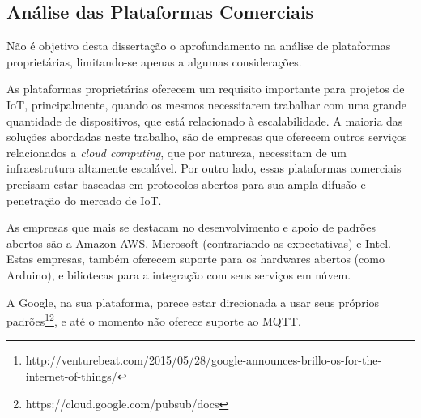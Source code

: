 \subsection{Análise das Plataformas Comerciais}

Não é objetivo desta dissertação o aprofundamento na análise de plataformas
proprietárias, limitando-se apenas a algumas considerações.

As plataformas proprietárias oferecem um requisito importante para
projetos de IoT, principalmente, quando os mesmos necessitarem trabalhar
com uma grande quantidade de dispositivos, que está relacionado à
escalabilidade. A maioria das soluções abordadas neste trabalho, são
de empresas que oferecem outros serviços relacionados a \emph{cloud
computing}, que por natureza, necessitam de um infraestrutura altamente
escalável. Por outro lado, essas plataformas comerciais precisam estar
baseadas em protocolos abertos para sua ampla difusão e penetração
do mercado de IoT.

As empresas que mais se destacam no desenvolvimento e apoio de padrões
abertos são a Amazon AWS, Microsoft (contrariando as expectativas)
e Intel. Estas empresas, também oferecem suporte para os hardwares
abertos (como Arduino), e biliotecas para a integração com seus serviços
em núvem.

A Google, na sua plataforma, parece estar direcionada a usar seus
próprios padrões\footnote{http://venturebeat.com/2015/05/28/google-announces-brillo-os-for-the-internet-of-things/}\footnote{https://cloud.google.com/pubsub/docs},
e até o momento não oferece suporte ao MQTT. 
